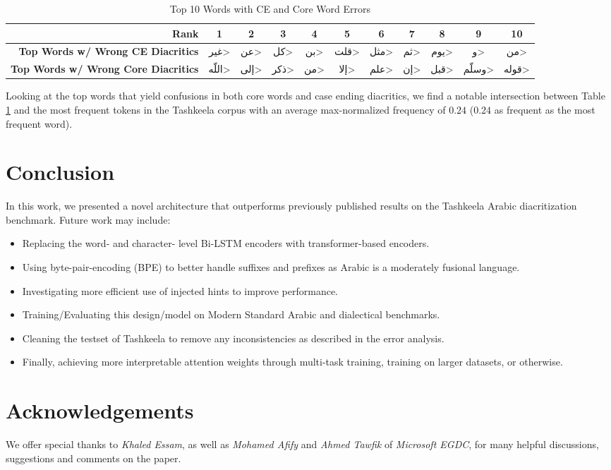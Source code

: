 \documentclass[11pt]{article}
\begin{document}
\begin{table}[h]
\begin{tabular}{|r|c|c|c|c|c|c|c|c|c|c|}
\hline
\textbf{Rank}                               & \textbf{1} & \textbf{2} & \textbf{3} & \textbf{4} & \textbf{5} & \textbf{6} & \textbf{7} & \textbf{8} & \textbf{9} & \textbf{10} \\ \hline
\textbf{Top Words w/ Wrong CE Diacritics}   & \<غير>     & \<عن>      & \<كل>      & \<بن>      & \<قلت>     & \<مثل>     &  \<ثم>     & \<يوم>     &  \<و>      &     \<من>   \\ \hline
\textbf{Top Words w/ Wrong Core Diacritics} & \<اللّه>    & \<إلى>     & \<ذكر>     & \<من>      &  \<إلا>     &  \<علم>    &  \<إن>     & \<قبل>     & \<وسلّم>    &   \<قوله>   \\ \hline
\end{tabular}
\caption{Top 10 Words with CE and Core Word Errors}
\label{top-error}
\end{table}

Looking at the top words that yield confusions in both core words and case ending diacritics, we find a notable intersection between Table \ref{top-error} and the most frequent tokens in the Tashkeela corpus with an average max-normalized frequency of $0.24$ ($0.24$ as frequent as the most frequent word).

\section{Conclusion}
In this work, we presented a novel architecture that outperforms previously published results on the Tashkeela Arabic diacritization benchmark. Future work may include:
\begin{itemize}
    \setlength\itemsep{-0.3em}
    \item Replacing the word- and character- level Bi-LSTM encoders with transformer-based encoders.
    \item Using byte-pair-encoding (BPE) \cite{bpe-16} to better handle suffixes and prefixes as Arabic is a moderately fusional language.
    \item Investigating more efficient use of injected hints to improve performance.
    \item Training/Evaluating this design/model on Modern Standard Arabic and dialectical benchmarks.
    \item Cleaning the testset of Tashkeela to remove any inconsistencies as described in the error analysis.
    \item Finally, achieving more interpretable attention weights through multi-task training, training on larger datasets, or otherwise.
\end{itemize}

\section*{Acknowledgements}
We offer special thanks to \textit{Khaled Essam}, as well as \textit{Mohamed Afify} and \textit{Ahmed Tawfik} of \textit{Microsoft EGDC}, for many helpful discussions, suggestions and comments on the paper.



\end{document}
